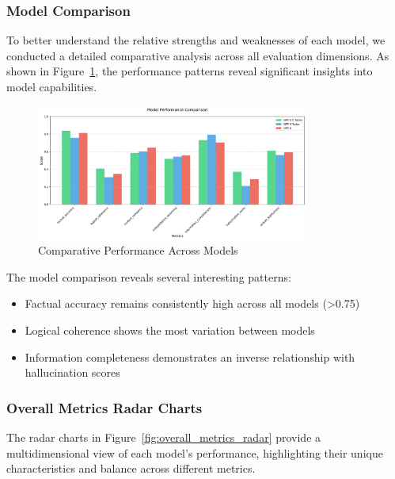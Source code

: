 \vspace{0.5em}
\subsubsection{Model Comparison}
To better understand the relative strengths and weaknesses of each model, we conducted a detailed comparative analysis across all evaluation dimensions. As shown in Figure~\ref{fig:model_comparison}, the performance patterns reveal significant insights into model capabilities.

\begin{figure}[!htbp]
\centering
\includegraphics[width=0.8\textwidth]{figures/overall/model_comparison.png}
\caption{Comparative Performance Across Models}
\label{fig:model_comparison}
\end{figure}

\vspace{0.5em}
The model comparison reveals several interesting patterns:
\begin{itemize}
    \item Factual accuracy remains consistently high across all models (>0.75)
    \item Logical coherence shows the most variation between models
    \item Information completeness demonstrates an inverse relationship with hallucination scores
\end{itemize}

\vspace{0.5em}
\subsubsection{Overall Metrics Radar Charts}
The radar charts in Figure~\ref{fig:overall_metrics_radar} provide a multidimensional view of each model's performance, highlighting their unique characteristics and balance across different metrics.

